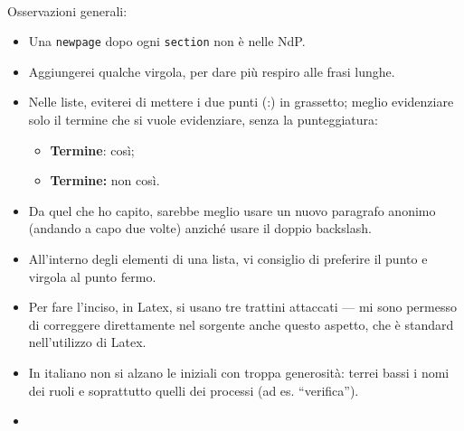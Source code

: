 \documentclass[a4paper]{article}
\begin{document}
\paragraph{}
Osservazioni generali:
\begin{itemize}
	\item Una \texttt{newpage} dopo ogni \texttt{section} non è nelle NdP.
	\item Aggiungerei qualche virgola, per dare più respiro alle frasi lunghe.
	\item Nelle liste, eviterei di mettere i due punti (:) in grassetto; meglio evidenziare solo il termine che si vuole evidenziare, senza la punteggiatura:
	\begin{itemize}
		\item \textbf{Termine}: così;
		\item \textbf{Termine:} non così.
	\end{itemize}
	\item Da quel che ho capito, sarebbe meglio usare un nuovo paragrafo anonimo (andando a capo due volte) anziché usare il doppio backslash.
	\item All'interno degli elementi di una lista, vi consiglio di preferire il punto e virgola al punto fermo.
	\item Per fare l'inciso, in Latex, si usano tre trattini attaccati --- mi sono permesso di correggere direttamente nel sorgente anche questo aspetto, che è standard nell'utilizzo di Latex.
	\item In italiano non si alzano le iniziali con troppa generosità: terrei bassi i nomi dei ruoli e soprattutto quelli dei processi (ad es. “verifica”).
	\item 
\end{itemize}
\end{document}
